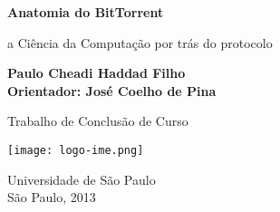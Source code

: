 \documentclass[a4paper, 11pt, oneside, brazil]{book}
\begin{document}
\thispagestyle{empty}

\frontmatter

%


\begin{titlepage}
    \begin{center}
        \vspace*{1cm}

        \Huge
        \textbf{Anatomia do BitTorrent}

        \vspace{0.5cm}
        \LARGE
        a Ciência da Computação por trás do protocolo

        \vspace{2.5cm}

        \textbf{
            Paulo Cheadi Haddad Filho \\
            Orientador: José Coelho de Pina
        }

        \vfill

        Trabalho de Conclusão de Curso

        \vspace{3.5cm}

        \texttt{[image: logo-ime.png]}

        \vspace{2cm}

        \Large
        Universidade de São Paulo\\
        São Paulo, 2013

    \end{center}
    \afterpage{\clearpage}

\end{titlepage}





\tableofcontents

\printglossaries

\listoffigures
\end{document}
